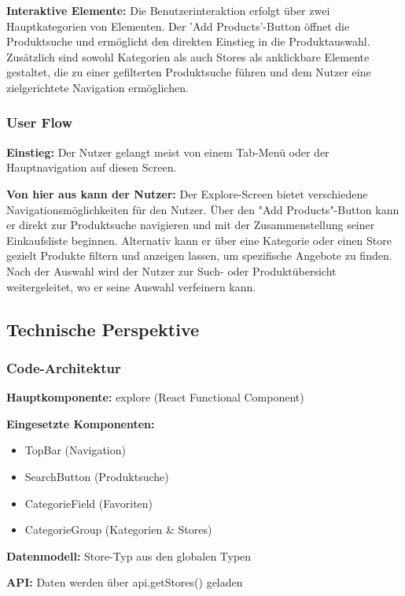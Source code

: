 \documentclass[12pt, a4paper]{report} %
\begin{document}
\noindent\textbf{Interaktive Elemente:}
Die Benutzerinteraktion erfolgt über zwei Hauptkategorien von Elementen. Der 'Add Products'-Button öffnet die Produktsuche und ermöglicht den direkten Einstieg in die Produktauswahl. Zusätzlich sind sowohl Kategorien als auch Stores als anklickbare Elemente gestaltet, die zu einer gefilterten Produktsuche führen und dem Nutzer eine zielgerichtete Navigation ermöglichen.

\subsubsection{User Flow}

\textbf{Einstieg:} Der Nutzer gelangt meist von einem Tab-Menü oder der Hauptnavigation auf diesen Screen.

\noindent\textbf{Von hier aus kann der Nutzer:}
Der Explore-Screen bietet verschiedene Navigationsmöglichkeiten für den Nutzer. Über den "Add Products"-Button kann er direkt zur Produktsuche navigieren und mit der Zusammenstellung seiner Einkaufsliste beginnen. Alternativ kann er über eine Kategorie oder einen Store gezielt Produkte filtern und anzeigen lassen, um spezifische Angebote zu finden. Nach der Auswahl wird der Nutzer zur Such- oder Produktübersicht weitergeleitet, wo er seine Auswahl verfeinern kann.

\subsection{Technische Perspektive}

\subsubsection{Code-Architektur}

\textbf{Hauptkomponente:} explore (React Functional Component)

\noindent\textbf{Eingesetzte Komponenten:}
\begin{itemize}
    \item TopBar (Navigation)
    \item SearchButton (Produktsuche)
    \item CategorieField (Favoriten)
    \item CategorieGroup (Kategorien \& Stores)
\end{itemize}

\noindent\textbf{Datenmodell:} Store-Typ aus den globalen Typen

\noindent\textbf{API:} Daten werden über api.getStores() geladen
\end{document}
